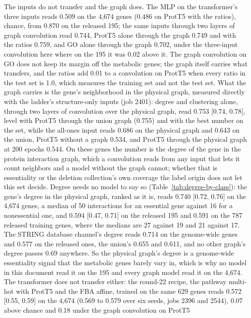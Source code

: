 The inputs do not transfer and the graph does. The MLP on the transformer's three
inputs reads 0.509 on the 4,674 genes (0.486 on ProtT5 with the ratios), chance, from
0.870 on the released 195; the same inputs through two layers of graph convolution read
0.744, ProtT5 alone through the graph 0.749 and with the ratios 0.759, and GO alone
through the graph 0.702, under the three-input convolution here where on the 195 it
was 0.02 above it. The graph convolution on GO does not keep its margin off the
metabolic genes; the graph itself carries what transfers, and the ratios add 0.01 to a
convolution on ProtT5 when every ratio in the test set is 1.0, which measures the
training set and not the test set. What the graph carries is the gene's neighborhood
in the physical graph, measured directly with the ladder's structure-only inputs
(job 2401): degree and clustering alone, through two layers of convolution over the
physical graph, read 0.753 [0.74, 0.78], level with ProtT5 through the union graph
(0.755) and with the best number on the set, while the all-ones input reads 0.686 on
the physical graph and 0.643 on the union, ProtT5 without a graph 0.534, and ProtT5
through the physical graph at 200 epochs 0.544. On these genes the number is the
degree of the gene in the protein interaction graph, which a convolution reads from
any input that lets it count neighbors and a model without the graph cannot; whether
that is essentiality or the deletion collection's own coverage the label origin does
not let this set decide. Degree needs no model to say so
(Table~\ref{tab:degree-by-class}): the gene's degree in the physical graph, ranked as
it is, reads 0.740 [0.72, 0.76] on the 4,674 genes, a median of 50 interactions for an
essential gene against 16 for a nonessential one, and 0.594 [0.47, 0.71] on the
released 195 and 0.591 on the 787 released training genes, where the medians are 27
against 19 and 21 against 17. The STRING database channel's degree reads 0.714 on the
genome-wide genes and 0.577 on the released ones, the union's 0.655 and 0.611, and no
other graph's degree passes 0.69 anywhere. So the physical graph's degree is a
genome-wide essentiality signal that the metabolic genes barely vary in, which is why
no model in this document read it on the 195 and every graph model read it on the
4,674. The transformer does not transfer either: the
round-22 recipe, the pathway multi-hot with ProtT5 and the FBA affine, trained on the
same 629 genes reads 0.572 [0.55, 0.59] on the 4,674 (0.569 to 0.579 over six seeds,
jobs 2396 and 2544), 0.07 above chance and 0.18 under the graph convolution on ProtT5
